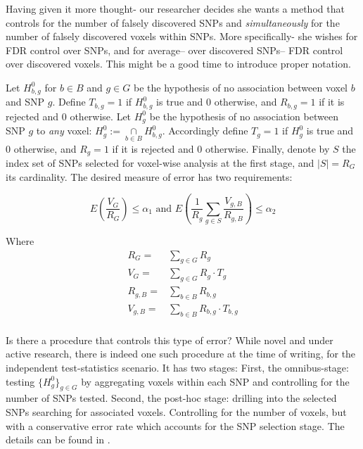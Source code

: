 \documentclass[draft,12pt]{article}
\begin{document}
Having given it more thought- our researcher decides she wants a method that controls for the number of falsely discovered SNPs and \emph{simultaneously} for the number of falsely discovered voxels within SNPs. More specifically- she wishes for FDR control over SNPs, and for average-- over discovered SNPs-- FDR control over discovered voxels. This might be a good time to introduce proper notation.


Let $H^0_{b,g}$ for $b \in B$ and $g \in G$ be the hypothesis of no association between voxel $b$ and SNP $g$. 
Define $T_{b,g}=1$ if $H^0_{b,g}$ is true and 0 otherwise, and $R_{b,g}=1$ if it is rejected and 0 otherwise. Let $H^0_g$ be the hypothesis of no association between SNP $g$ to \emph{any} voxel: $ H^0_g:= \underset{b\in B}{\cap} H^0_{b,g}$.  
Accordingly define $T_{g}=1$ if $H^0_{g}$ is true and 0 otherwise, and $R_{g}=1$ if it is rejected and 0 otherwise. 
Finally, denote by $S$ the index set of SNPs selected for voxel-wise analysis at the first stage, and $\left| S \right|=R_G$ its cardinality. The desired measure of error has two requirements: 


\begin{equation} \label{eq:hirarchial_error}
 E \left(\frac{V_G}{R_G} \right)\leq \alpha_1 
\text{ and } 
E \left( \frac{1}{R_g}\sum_{g \in S} \frac{V_{g,B}}{R_{g,B}} \right)\leq \alpha_2
\end{equation}




Where 
\begin{align*} 
   R_G = {}& \sum_{g \in G} R_g \\
   V_G = {}& \sum_{g \in G} R_g \cdot T_g \\
   R_{g,B} = {}& \sum_{b \in B} R_{b,g}\\
   V_{g,B} = {}& \sum_{b \in B} R_{b,g} \cdot T_{b,g}  \\
\end{align*}

Is there a procedure that controls this type of error? While novel and under active research, there is indeed one such procedure at the time of writing, for the independent test-statistics scenario. It has two stages: 
First, the omnibus-stage:  testing $\{H^0_{g}\}_{g \in G}$ by aggregating voxels within each SNP and controlling for the number of SNPs tested. Second, the post-hoc stage: drilling into the selected SNPs searching for associated voxels. Controlling for the number of voxels, but with a conservative error rate which accounts for the SNP selection stage. 
The details can be found in \citet{benjamini_adjusting_2011}.
\end{document}
